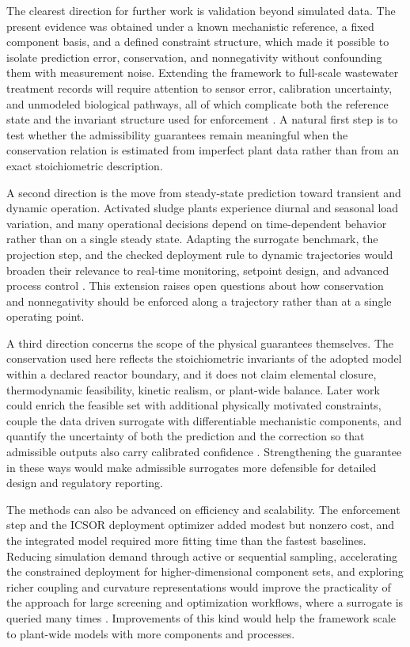 \documentclass[12pt, twoside]{book}
\begin{document}
The clearest direction for further work is validation beyond simulated data. The present evidence was obtained
under a known mechanistic reference, a fixed component basis, and a defined constraint structure, which made it
possible to isolate prediction error, conservation, and nonnegativity without confounding them with measurement
noise. Extending the framework to full-scale wastewater treatment records will require attention to sensor
error, calibration uncertainty, and unmodeled biological pathways, all of which complicate both the reference
state and the invariant structure used for enforcement \citep{Machado2014,Newhart2019}. A natural first step is
to test whether the admissibility guarantees remain meaningful when the conservation relation is estimated from
imperfect plant data rather than from an exact stoichiometric description.

A second direction is the move from steady-state prediction toward transient and dynamic operation. Activated
sludge plants experience diurnal and seasonal load variation, and many operational decisions depend on
time-dependent behavior rather than on a single steady state. Adapting the surrogate benchmark, the projection
step, and the checked deployment rule to dynamic trajectories would broaden their relevance to real-time
monitoring, setpoint design, and advanced process control \citep{Sadeghassadi2018,Croll2023}. This extension
raises open questions about how conservation and nonnegativity should be enforced along a trajectory rather than
at a single operating point.

A third direction concerns the scope of the physical guarantees themselves. The conservation used here reflects
the stoichiometric invariants of the adopted model within a declared reactor boundary, and it does not claim
elemental closure, thermodynamic feasibility, kinetic realism, or plant-wide balance. Later work could enrich
the feasible set with additional physically motivated constraints, couple the data driven surrogate with
differentiable mechanistic components, and quantify the uncertainty of both the prediction and the correction
so that admissible outputs also carry calibrated confidence \citep{Shen2023,Valente2025}. Strengthening the
guarantee in these ways would make admissible surrogates more defensible for detailed design and regulatory
reporting.

The methods can also be advanced on efficiency and scalability. The enforcement step and the ICSOR deployment
optimizer added modest but nonzero cost, and the integrated model required more fitting time than the fastest
baselines. Reducing simulation demand through active or sequential sampling, accelerating the constrained
deployment for higher-dimensional component sets, and exploring richer coupling and curvature representations
would improve the practicality of the approach for large screening and optimization workflows, where a
surrogate is queried many times \citep{BhosekarIerapetritou2018,Durkin2024,PadronPaez2020,Aboagye2021}.
Improvements of this kind would help the framework scale to plant-wide models with more components and
processes.
\end{document}
